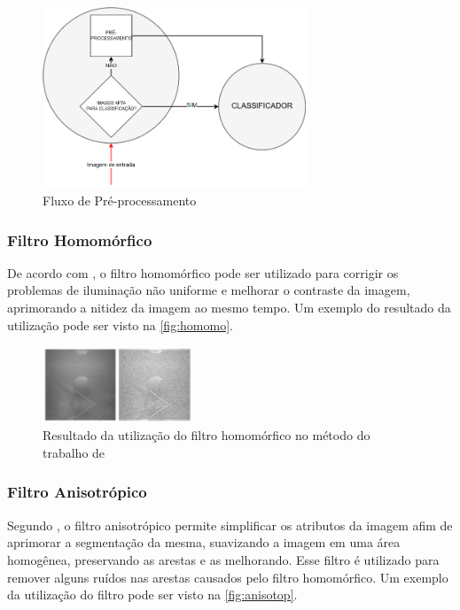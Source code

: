 \begin{figure}[ht]
	\centering
    \caption{\label{fig:bigpic}Fluxo de Pré-processamento}
	\includegraphics[width = 0.7\textwidth]{resources/fluxoprocessamento.png}
\end{figure}

\subsubsection{Filtro Homomórfico}
De acordo com , o filtro homomórfico pode ser utilizado para corrigir os problemas de iluminação não uniforme e melhorar o contraste da imagem, aprimorando a nitidez da imagem ao mesmo tempo. Um exemplo do resultado da utilização pode ser visto na \autoref{fig:homomo}.

\begin{figure}[ht]
	\centering
    \caption{\label{fig:homomo}Resultado da utilização do filtro homomórfico no método do trabalho de }
	\includegraphics[width = 0.4\textwidth]{resources/homomo1.png}
\end{figure}


\subsubsection{Filtro Anisotrópico}
Segundo , o filtro anisotrópico permite simplificar os atributos da imagem afim de aprimorar a segmentação da mesma, suavizando a imagem em uma área homogênea, preservando as arestas e as melhorando. Esse filtro é utilizado para remover alguns ruídos nas arestas causados pelo filtro homomórfico. Um exemplo da utilização do filtro pode ser visto na \autoref{fig:anisotop}. 

